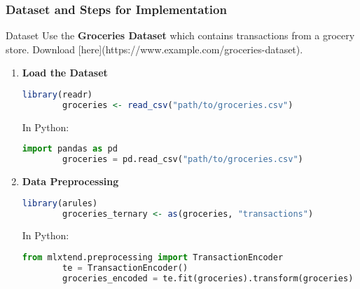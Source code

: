 \documentclass[aspectratio=169]{beamer}
\begin{document}
\begin{frame}[fragile]
    \frametitle{Dataset and Steps for Implementation}
    \begin{block}{Dataset}
        Use the \textbf{Groceries Dataset} which contains transactions from a grocery store. Download [here](https://www.example.com/groceries-dataset).
    \end{block}
    
    \begin{enumerate}
        \item \textbf{Load the Dataset}
        \begin{lstlisting}[language=R]
        library(readr)
        groceries <- read_csv("path/to/groceries.csv")
        \end{lstlisting}
        In Python:
        \begin{lstlisting}[language=Python]
        import pandas as pd
        groceries = pd.read_csv("path/to/groceries.csv")
        \end{lstlisting}
        
        \item \textbf{Data Preprocessing}
        \begin{lstlisting}[language=R]
        library(arules)
        groceries_ternary <- as(groceries, "transactions")
        \end{lstlisting}
        In Python:
        \begin{lstlisting}[language=Python]
        from mlxtend.preprocessing import TransactionEncoder
        te = TransactionEncoder()
        groceries_encoded = te.fit(groceries).transform(groceries)
        \end{lstlisting}
    \end{enumerate}
\end{frame}
\end{document}
